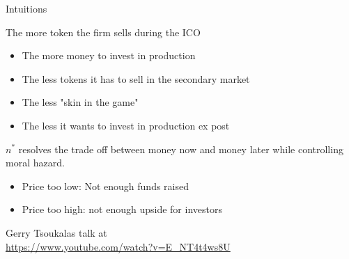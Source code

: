 \documentclass{beamer}
\begin{document}
\begin{frame}{Intuitions}
\scriptsize
\begin{tcolorbox}[enhanced,drop shadow, title=Optimal number of tokens sold $n^\ast$ ]

The more token the firm sells during the ICO
\begin{itemize}
  \item The more money to invest in production
  \item The less tokens it has to sell in the secondary market
  \item The less "skin in the game"
  \item The less it wants to invest in production ex post
\end{itemize}
$n^\ast$ resolves the trade off between money now and money later while controlling moral hazard.
\end{tcolorbox}
\begin{tcolorbox}[enhanced,drop shadow, title=Optimal number of tokens sold $\tau^\ast$ ]


\begin{itemize}
  \item Price too low: Not enough funds raised
  \item Price too high: not enough upside for investors
\end{itemize} 
\end{tcolorbox}
Gerry Tsoukalas talk at \\
\url{https://www.youtube.com/watch?v=E_NT4t4ws8U}
\end{frame}
\end{document}
